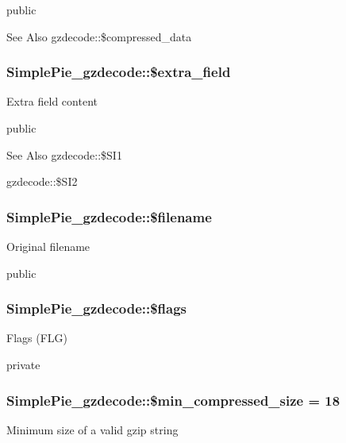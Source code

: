 public \begin{DoxySeeAlso}{See Also}
gzdecode\-::\$compressed\-\_\-data 
\end{DoxySeeAlso}
\hypertarget{class_simple_pie__gzdecode_a83748c3d50d53d05a206ae8654a8377c}{
\subsubsection[{\$extra\-\_\-field}]{\setlength{\rightskip}{0pt plus 5cm}Simple\-Pie\-\_\-gzdecode\-::\$extra\-\_\-field}}\label{class_simple_pie__gzdecode_a83748c3d50d53d05a206ae8654a8377c}
Extra field content

public \begin{DoxySeeAlso}{See Also}
gzdecode\-::\$\-S\-I1 

gzdecode\-::\$\-S\-I2 
\end{DoxySeeAlso}
\hypertarget{class_simple_pie__gzdecode_a6ec33376dca9c3833d067a61bf341180}{
\subsubsection[{\$filename}]{\setlength{\rightskip}{0pt plus 5cm}Simple\-Pie\-\_\-gzdecode\-::\$filename}}\label{class_simple_pie__gzdecode_a6ec33376dca9c3833d067a61bf341180}
Original filename

public \hypertarget{class_simple_pie__gzdecode_a4d077416068dce2c42011ab4a0f110a1}{
\subsubsection[{\$flags}]{\setlength{\rightskip}{0pt plus 5cm}Simple\-Pie\-\_\-gzdecode\-::\$flags}}\label{class_simple_pie__gzdecode_a4d077416068dce2c42011ab4a0f110a1}
Flags (F\-L\-G)

private \hypertarget{class_simple_pie__gzdecode_a8f08498db9b83f4cbcfbc5282dc629c7}{
\subsubsection[{\$min\-\_\-compressed\-\_\-size}]{\setlength{\rightskip}{0pt plus 5cm}Simple\-Pie\-\_\-gzdecode\-::\$min\-\_\-compressed\-\_\-size = 18}}\label{class_simple_pie__gzdecode_a8f08498db9b83f4cbcfbc5282dc629c7}
Minimum size of a valid gzip string

